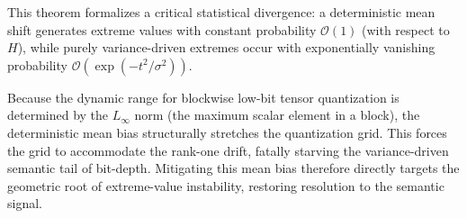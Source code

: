 This theorem formalizes a critical statistical divergence: a deterministic mean shift generates extreme values with constant probability $\mathcal{O}(1)$ (with respect to $H$), while purely variance-driven extremes occur with exponentially vanishing probability $\mathcal{O}(\exp(-t^2/\sigma^2))$. 

Because the dynamic range for blockwise low-bit tensor quantization is determined by the $L_\infty$ norm (the maximum scalar element in a block), the deterministic mean bias structurally stretches the quantization grid. This forces the grid to accommodate the rank-one drift, fatally starving the variance-driven semantic tail of bit-depth. Mitigating this mean bias therefore directly targets the geometric root of extreme-value instability, restoring resolution to the semantic signal.